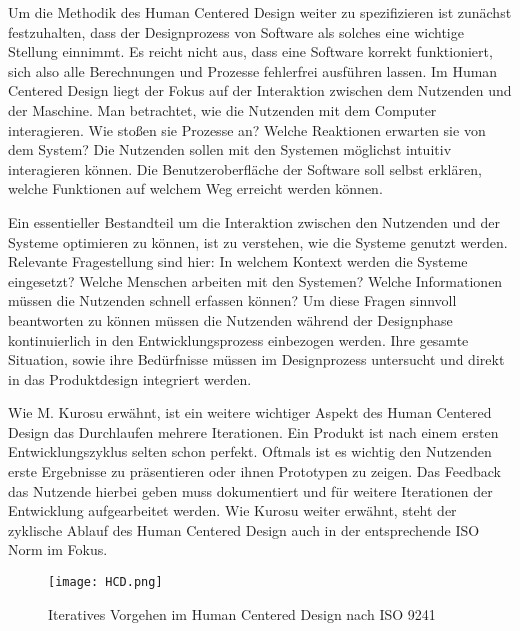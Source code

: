 Um die Methodik des Human Centered Design weiter zu spezifizieren ist zunächst
festzuhalten, dass der Designprozess von Software als solches eine wichtige
Stellung einnimmt. Es reicht nicht aus, dass eine Software korrekt
funktioniert, sich also alle Berechnungen und Prozesse fehlerfrei ausführen
lassen. Im Human Centered Design liegt der Fokus auf der Interaktion zwischen
dem Nutzenden und der Maschine. Man betrachtet, wie die Nutzenden mit dem
Computer interagieren. Wie stoßen sie Prozesse an? Welche Reaktionen erwarten
sie von dem System? Die Nutzenden sollen mit den Systemen möglichst intuitiv
interagieren können. Die Benutzeroberfläche der Software soll selbst erklären,
welche Funktionen auf welchem Weg erreicht werden können.

Ein essentieller Bestandteil um die Interaktion zwischen den Nutzenden und der
Systeme optimieren zu können, ist zu verstehen, wie die Systeme genutzt werden.
Relevante Fragestellung sind hier: In welchem Kontext werden die Systeme
eingesetzt? Welche Menschen arbeiten mit den Systemen? Welche Informationen
müssen die Nutzenden schnell erfassen können? Um diese Fragen sinnvoll
beantworten zu können müssen die Nutzenden während der Designphase
kontinuierlich in den Entwicklungsprozess einbezogen werden. Ihre gesamte
Situation, sowie ihre Bedürfnisse müssen im Designprozess untersucht und direkt
in das Produktdesign integriert werden.\cite{hci}

Wie M. Kurosu erwähnt, ist ein weitere wichtiger Aspekt des Human Centered
Design das Durchlaufen mehrere Iterationen. Ein Produkt ist nach einem ersten
Entwicklungszyklus selten schon perfekt. Oftmals ist es wichtig den Nutzenden
erste Ergebnisse zu präsentieren oder ihnen Prototypen zu zeigen. Das Feedback
das Nutzende hierbei geben muss dokumentiert und für weitere Iterationen der
Entwicklung aufgearbeitet werden. Wie Kurosu weiter erwähnt, steht der
zyklische Ablauf des Human Centered Design auch in der entsprechende ISO Norm
im Fokus.\cite{kurosuHCI}

\begin{figure}[h]
    \caption{Iteratives Vorgehen im Human Centered Design nach ISO 9241 \cite{iso9241}}
    \centering
    \texttt{[image: HCD.png]}
\end{figure}


